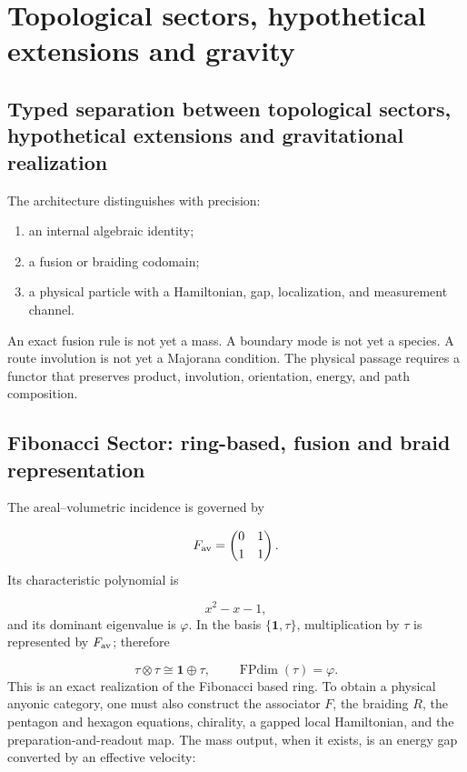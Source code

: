 \section{Topological sectors, hypothetical extensions and gravity}
\subsection{Typed separation between topological sectors, hypothetical extensions and gravitational realization}
The architecture distinguishes with precision:

\begin{enumerate}
\item an internal algebraic identity;
\item a fusion or braiding codomain;
\item a physical particle with a Hamiltonian, gap, localization, and
measurement channel.

\end{enumerate}
An exact fusion rule is not yet a mass. A boundary mode is not yet a species. A route involution is not yet a Majorana condition. The physical passage requires a functor that preserves product, involution, orientation, energy, and path composition.

\subsection{Fibonacci Sector: ring-based, fusion and braid representation}
The areal--volumetric incidence is governed by

\[
F_{\rm av}=
\begin{pmatrix}
0&1\\[2pt]1&1
\end{pmatrix}.
\]
Its characteristic polynomial is

\[
x^2-x-1,
\]
and its dominant eigenvalue is \(\varphi\). In the basis \(\{\mathbf1,\tau\}\), multiplication by \(\tau\) is represented by \(F_{\rm av}\); therefore

\[
\tau\otimes\tau\cong\mathbf1\oplus\tau,
\qquad
\operatorname{FPdim}(\tau)=\varphi.
\]
This is an exact realization of the Fibonacci based ring. To obtain a physical anyonic category, one must also construct the associator \(F\), the braiding \(R\), the pentagon and hexagon equations, chirality, a gapped local Hamiltonian, and the preparation-and-readout map. The mass output, when it exists, is an energy gap converted by an effective velocity:

